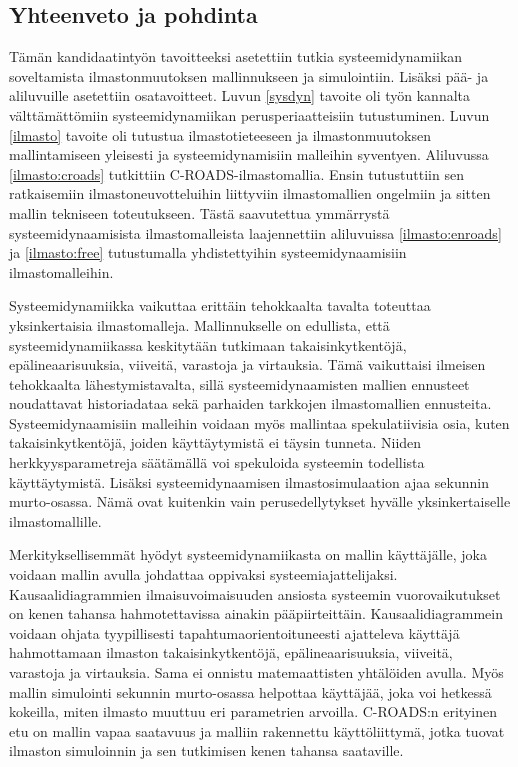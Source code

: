 \documentclass[finnish,12pt,a4paper,pdftex]{article}
\begin{document}
\begin{onehalfspacing}
\clearpage

\section{Yhteenveto ja pohdinta \label{yhteenveto}}

Tämän kandidaatintyön tavoitteeksi asetettiin tutkia systeemidynamiikan soveltamista ilmastonmuutoksen mallinnukseen ja simulointiin. Lisäksi pää- ja aliluvuille asetettiin osatavoitteet. Luvun \ref{sysdyn} tavoite oli työn kannalta välttämättömiin systeemidynamiikan perusperiaatteisiin tutustuminen. Luvun \ref{ilmasto} tavoite oli tutustua ilmastotieteeseen ja ilmastonmuutoksen mallintamiseen yleisesti ja systeemidynamisiin malleihin syventyen. Aliluvussa \ref{ilmasto:croads} tutkittiin C-ROADS-ilmastomallia. Ensin tutustuttiin sen ratkaisemiin ilmastoneuvotteluihin liittyviin ilmastomallien ongelmiin ja sitten mallin tekniseen toteutukseen. Tästä saavutettua ymmärrystä systeemidynaamisista ilmastomalleista laajennettiin aliluvuissa \ref{ilmasto:enroads} ja \ref{ilmasto:free} tutustumalla yhdistettyihin systeemidynaamisiin ilmastomalleihin. 

Systeemidynamiikka vaikuttaa erittäin tehokkaalta tavalta toteuttaa yksinkertaisia ilmastomalleja. Mallinnukselle on edullista, että systeemidynamiikassa keskitytään tutkimaan takaisinkytkentöjä, epälineaarisuuksia, viiveitä, varastoja ja virtauksia. Tämä vaikuttaisi ilmeisen tehokkaalta lähestymistavalta, sillä systeemidynaamisten mallien ennusteet noudattavat historiadataa sekä parhaiden tarkkojen ilmastomallien ennusteita. Systeemidynaamisiin malleihin voidaan myös mallintaa spekulatiivisia osia, kuten takaisinkytkentöjä, joiden käyttäytymistä ei täysin tunneta. Niiden herkkyysparametreja säätämällä voi spekuloida systeemin todellista käyttäytymistä. Lisäksi systeemidynaamisen ilmastosimulaation ajaa sekunnin murto-osassa. Nämä ovat kuitenkin vain perusedellytykset hyvälle yksinkertaiselle ilmastomallille. 

Merkityksellisemmät hyödyt systeemidynamiikasta on mallin käyttäjälle, joka voidaan mallin avulla johdattaa oppivaksi systeemiajattelijaksi. Kausaalidiagrammien ilmaisuvoimaisuuden ansiosta systeemin vuorovaikutukset on kenen tahansa hahmotettavissa ainakin pääpiirteittäin. Kausaalidiagrammein voidaan ohjata tyypillisesti tapahtumaorientoituneesti ajatteleva käyttäjä hahmottamaan ilmaston takaisinkytkentöjä, epälineaarisuuksia, viiveitä, varastoja ja virtauksia. Sama ei onnistu matemaattisten yhtälöiden avulla. Myös mallin simulointi sekunnin murto-osassa helpottaa käyttäjää, joka voi hetkessä kokeilla, miten ilmasto muuttuu eri parametrien arvoilla. C-ROADS:n erityinen etu on mallin vapaa saatavuus ja malliin rakennettu käyttöliittymä, jotka tuovat ilmaston simuloinnin ja sen tutkimisen kenen tahansa saataville. 


\end{onehalfspacing}
\end{document}
